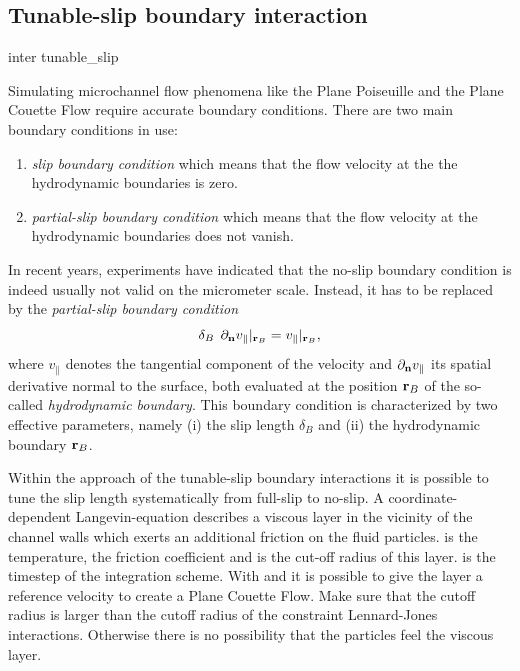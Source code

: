\subsection{Tunable-slip boundary interaction}\label{sec:tunableSlip}
\begin{essyntax}
  inter  
  tunable_slip    
    
  \begin{features}
  \end{features}
\end{essyntax}
Simulating microchannel flow phenomena like the Plane Poiseuille and
the Plane Couette Flow require accurate boundary conditions. There are
two main boundary conditions in use:

\begin{enumerate} 
\item \emph{slip boundary condition} which means that the flow
  velocity at the the hydrodynamic boundaries is zero.
\item \emph{partial-slip boundary condition} which means that the flow 
  velocity at the hydrodynamic boundaries does not vanish.
\end{enumerate}

In recent years, experiments have indicated that the no-slip boundary
condition is indeed usually not valid on the micrometer
scale. Instead, it has to be replaced by the {\em {partial-slip
    boundary condition}}
\begin{displaymath}
\delta_B \: \: \partial_{{\bf n}} v_{\parallel}|_{{\bf r}_B} =
v_{\parallel}|_{{\bf r}_B},
\end{displaymath}
where $v_{\parallel}$ denotes the tangential component of the velocity
and $\partial_{{\bf n}} v_{\parallel}$ its spatial derivative normal
to the surface, both evaluated at the position ${\bf r}_B$ of the
so-called {\em hydrodynamic boundary}.  This boundary condition is
characterized by two effective parameters, namely (i) the slip length
$\delta_B$ and (ii) the hydrodynamic boundary ${\bf r}_B$.

Within the approach of the tunable-slip boundary interactions it is
possible to tune the slip length systematically from full-slip to
no-slip.  A coordinate-dependent Langevin-equation describes a viscous
layer in the vicinity of the channel walls which exerts an additional
friction on the fluid particles.   is the temperature,
 the friction coefficient and  is
the cut-off radius of this layer.  is the timestep of
the integration scheme. With   and  it is
possible to give the layer a reference velocity to create a Plane
Couette Flow.  Make sure that the cutoff radius 
is larger than the cutoff radius of the constraint Lennard-Jones
interactions. Otherwise there is no possibility that the particles
feel the viscous layer.

